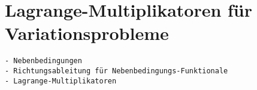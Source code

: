%
%
%
\section{Lagrange-Multiplikatoren für Variationsprobleme
\label{buch:nebenbedingungen:section:lagrangemult}}

\begin{verbatim}
- Nebenbedingungen
- Richtungsableitung für Nebenbedingungs-Funktionale
- Lagrange-Multiplikatoren
\end{verbatim}
